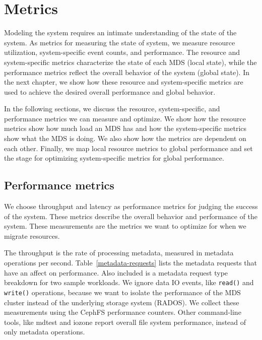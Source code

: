 \chapter{Metrics}
\label{metrics}
Modeling the system requires an intimate understanding of the state of the system. As metrics for measuring the state of system, we measure resource utilization, system-specific event counts, and performance. The resource and system-specific metrics characterize the state of each MDS (local state), while the performance metrics reflect the overall behavior of the system (global state). In the next chapter, we show how these resource and system-specific metrics are used to achieve the desired overall performance and global behavior.

In the following sections, we discuss the resource, system-specific, and performance metrics we can measure and optimize. We show how the resource metrics show how much load an MDS has and how the system-specific metrics show what the MDS is doing. We also show how the metrics are dependent on each other. Finally, we map local resource metrics to global performance and set the stage for optimizing system-specific metrics for global performance. 

\section{Performance metrics}
We choose throughput and latency as performance metrics for judging the success of the system. These metrics describe the overall behavior and performance of the system. These measurements are the metrics we want to optimize for when we migrate resources. 

The throughput is the rate of processing metadata, measured in metadata operations per second. Table~\ref{metadata-requests} lists the metadata requests that have an affect on performance. Also included is a metadata request type breakdown for two sample workloads. We ignore data IO events, like \texttt{read()} and \texttt{write()} operations, because we want to isolate the performance of the MDS cluster instead of the underlying storage system (RADOS). We collect these measurements using the CephFS performance counters. Other command-line tools, like mdtest and iozone report overall file system performance, instead of only metadata operations. 

